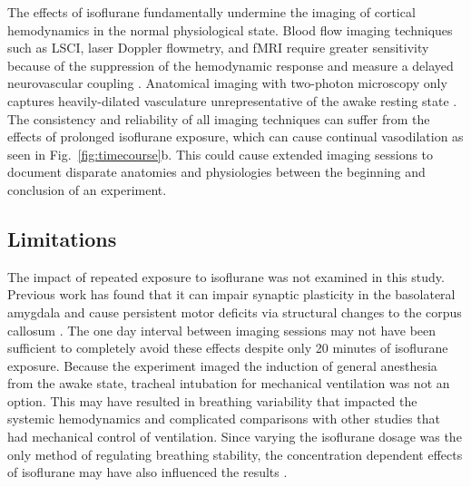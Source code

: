\documentclass[review]{elsarticle}
\begin{document}
The effects of isoflurane fundamentally undermine the imaging of cortical hemodynamics in the normal physiological state. Blood flow imaging techniques such as LSCI, laser Doppler flowmetry, and fMRI require greater sensitivity because of the suppression of the hemodynamic response \cite{Takuwa:2012ee} and measure a delayed neurovascular coupling \cite{Pisauro:2013cx}. Anatomical imaging with two-photon microscopy only captures heavily-dilated vasculature unrepresentative of the awake resting state \cite{Lyons:2016bd}. The consistency and reliability of all imaging techniques can suffer from the effects of prolonged isoflurane exposure, which can cause continual vasodilation as seen in Fig.~\ref{fig:timecourse}b. This could cause extended imaging sessions to document disparate anatomies and physiologies between the beginning and conclusion of an experiment.



\subsection{Limitations}

The impact of repeated exposure to isoflurane was not examined in this study. Previous work has found that it can impair synaptic plasticity in the basolateral amygdala \cite{Long:2016ri} and cause persistent motor deficits via structural changes to the corpus callosum \cite{Bajwa:2018ri}. The one day interval between imaging sessions may not have been sufficient to completely avoid these effects despite only 20 minutes of isoflurane exposure. Because the experiment imaged the induction of general anesthesia from the awake state, tracheal intubation for mechanical ventilation was not an option. This may have resulted in breathing variability that impacted the systemic hemodynamics and complicated comparisons with other studies that had mechanical control of ventilation. Since varying the isoflurane dosage was the only method of regulating breathing stability, the concentration dependent effects of isoflurane may have also influenced the results \cite{Masamoto:2009dd,Li:2014eh}.
\end{document}
